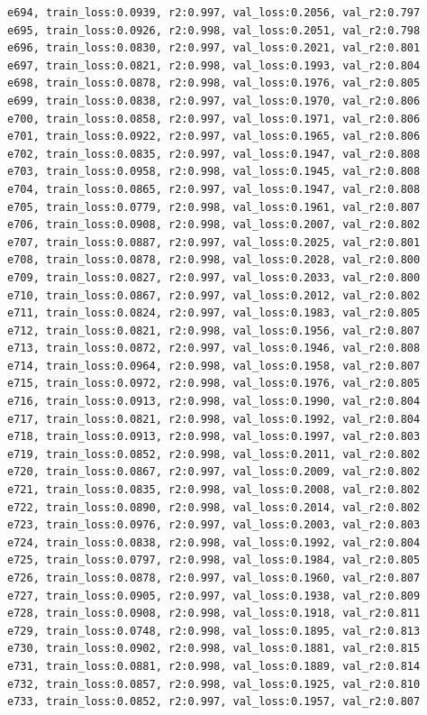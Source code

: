 \documentclass[a4paper, 12pt]{article}
\begin{document}
\begin{lstlisting}
e694, train_loss:0.0939, r2:0.997, val_loss:0.2056, val_r2:0.797
e695, train_loss:0.0926, r2:0.998, val_loss:0.2051, val_r2:0.798
e696, train_loss:0.0830, r2:0.997, val_loss:0.2021, val_r2:0.801
e697, train_loss:0.0821, r2:0.998, val_loss:0.1993, val_r2:0.804
e698, train_loss:0.0878, r2:0.998, val_loss:0.1976, val_r2:0.805
e699, train_loss:0.0838, r2:0.997, val_loss:0.1970, val_r2:0.806
e700, train_loss:0.0858, r2:0.997, val_loss:0.1971, val_r2:0.806
e701, train_loss:0.0922, r2:0.997, val_loss:0.1965, val_r2:0.806
e702, train_loss:0.0835, r2:0.997, val_loss:0.1947, val_r2:0.808
e703, train_loss:0.0958, r2:0.998, val_loss:0.1945, val_r2:0.808
e704, train_loss:0.0865, r2:0.997, val_loss:0.1947, val_r2:0.808
e705, train_loss:0.0779, r2:0.998, val_loss:0.1961, val_r2:0.807
e706, train_loss:0.0908, r2:0.998, val_loss:0.2007, val_r2:0.802
e707, train_loss:0.0887, r2:0.997, val_loss:0.2025, val_r2:0.801
e708, train_loss:0.0878, r2:0.998, val_loss:0.2028, val_r2:0.800
e709, train_loss:0.0827, r2:0.997, val_loss:0.2033, val_r2:0.800
e710, train_loss:0.0867, r2:0.997, val_loss:0.2012, val_r2:0.802
e711, train_loss:0.0824, r2:0.997, val_loss:0.1983, val_r2:0.805
e712, train_loss:0.0821, r2:0.998, val_loss:0.1956, val_r2:0.807
e713, train_loss:0.0872, r2:0.997, val_loss:0.1946, val_r2:0.808
e714, train_loss:0.0964, r2:0.998, val_loss:0.1958, val_r2:0.807
e715, train_loss:0.0972, r2:0.998, val_loss:0.1976, val_r2:0.805
e716, train_loss:0.0913, r2:0.998, val_loss:0.1990, val_r2:0.804
e717, train_loss:0.0821, r2:0.998, val_loss:0.1992, val_r2:0.804
e718, train_loss:0.0913, r2:0.998, val_loss:0.1997, val_r2:0.803
e719, train_loss:0.0852, r2:0.998, val_loss:0.2011, val_r2:0.802
e720, train_loss:0.0867, r2:0.997, val_loss:0.2009, val_r2:0.802
e721, train_loss:0.0835, r2:0.998, val_loss:0.2008, val_r2:0.802
e722, train_loss:0.0890, r2:0.998, val_loss:0.2014, val_r2:0.802
e723, train_loss:0.0976, r2:0.997, val_loss:0.2003, val_r2:0.803
e724, train_loss:0.0838, r2:0.998, val_loss:0.1992, val_r2:0.804
e725, train_loss:0.0797, r2:0.998, val_loss:0.1984, val_r2:0.805
e726, train_loss:0.0878, r2:0.997, val_loss:0.1960, val_r2:0.807
e727, train_loss:0.0905, r2:0.997, val_loss:0.1938, val_r2:0.809
e728, train_loss:0.0908, r2:0.998, val_loss:0.1918, val_r2:0.811
e729, train_loss:0.0748, r2:0.998, val_loss:0.1895, val_r2:0.813
e730, train_loss:0.0902, r2:0.998, val_loss:0.1881, val_r2:0.815
e731, train_loss:0.0881, r2:0.998, val_loss:0.1889, val_r2:0.814
e732, train_loss:0.0857, r2:0.998, val_loss:0.1925, val_r2:0.810
e733, train_loss:0.0852, r2:0.997, val_loss:0.1957, val_r2:0.807

\end{lstlisting}
\end{document}
